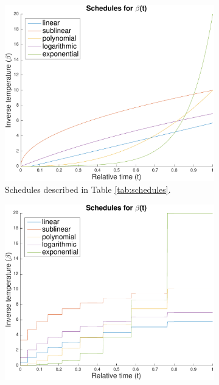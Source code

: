 \documentclass{article}
\begin{document}
  \begin{figure}[h]
    \centering
    \begin{subfigure}[t]{.33\linewidth} %
      \centering
      \includegraphics[width=1\linewidth]{figures/schedules_linear_shape.pdf}
      \caption{Schedules described in Table \ref{tab:schedules}.}
      \label{fig:schedules_linear_shape}
    \end{subfigure}%
     \begin{subfigure}[t]{.33\linewidth} %
      \centering
      \includegraphics[width=1\linewidth]{figures/schedules_discretized_shape.pdf}

\end{subfigure}
\end{figure}
\end{document}
